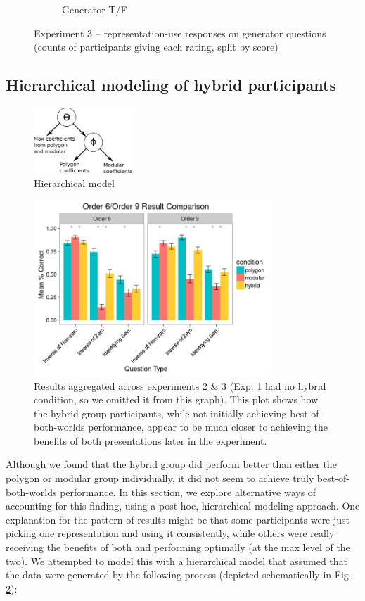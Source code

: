 \documentclass[man,10pt]{apa6}
\begin{document}
\begin{figure}
\begin{subfigure}[c]{0.45\textwidth}
\caption{Generator T/F}
\end{subfigure}
\caption{Experiment 3 -- representation-use responses on generator questions (counts of participants giving each rating, split by score)}

\label{ex3_wr_gen}
\end{figure}
\subsection{Hierarchical modeling of hybrid participants}
\begin{figure}
\centering
\includegraphics[width=0.33\textwidth]{figures/hierarchical_model_schematic.png}
\caption{Hierarchical model}
\label{hierarchicalmodel}
\end{figure}
\begin{figure}
\centering
\includegraphics[width=0.8\textwidth]{figures/order_69_results.png}
\caption{Results aggregated across experiments 2 \& 3 (Exp. 1 had no hybrid condition, so we omitted it from this graph). This plot shows how the hybrid group participants, while not initially achieving best-of-both-worlds performance, appear to be much closer to achieving the benefits of both presentations later in the experiment.}
\label{order_69_results}
\end{figure}
Although we found that the hybrid group did perform better than either the polygon or modular group individually, it did not seem to achieve truly best-of-both-worlds performance. In this section, we explore alternative ways of accounting for this finding, using a post-hoc, hierarchical modeling approach. One explanation for the pattern of results might be that some participants were just picking one representation and using it consistently, while others were really receiving the benefits of both and performing optimally (at the max level of the two). We attempted to model this with a hierarchical model that assumed that the data were generated by the following process (depicted schematically in Fig. \ref{hierarchicalmodel}): 
\end{document}
